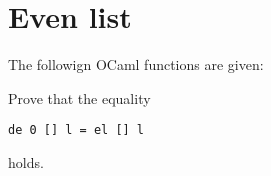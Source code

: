 \section{Even list}
The followign OCaml functions are given:

Prove that the equality
\begin{center}
    \begin{lstlisting}
de 0 [] l = el [] l\end{lstlisting}
\end{center}
holds.